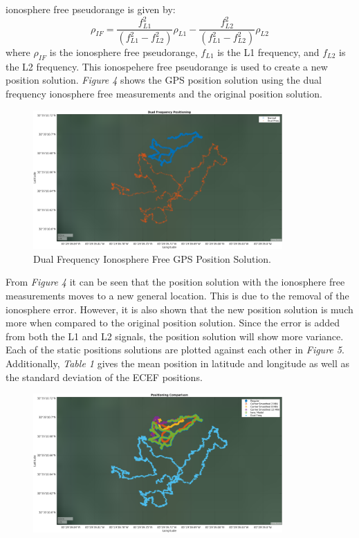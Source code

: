\documentclass[11pt]{article}
\begin{document}
\begin{enumerate}[label=\textbf{\arabic*.}]
    ionosphere free pseudorange is given by:
    \begin{equation}
      \rho_{IF} = \dfrac{f_{L1}^2}{(f_{L1}^2-f_{L2}^2)}\rho_{L1} - 
                  \dfrac{f_{L2}^2}{(f_{L1}^2-f_{L2}^2)}\rho_{L2}
    \end{equation}
    where $\rho_{IF}$ is the ionosphere free pseudorange, $f_{L1}$ is the L1 
    frequency, and $f_{L2}$ is the L2 frequency. This ionospehere free pseudorange 
    is used to create a new position solution. \emph{Figure 4} shows the GPS 
    position solution using the dual frequency ionosphere free measurements and 
    the original position solution. 
    \begin{figure}[H]
        \centering
        \includegraphics[width=0.85\textwidth]{p1_d.png}
        \caption{Dual Frequency Ionosphere Free GPS Position Solution.}
    \end{figure}
    From \emph{Figure 4} it can be seen that the position solution with the 
    ionosphere free measurements moves to a new general location. This is due to 
    the removal of the ionosphere error. However, it is also shown that the new 
    position solution is much more  when compared to the original position 
    solution. Since the error is added from both the L1 and L2 signals, the 
    position solution will show more variance. Each of the static positions 
    solutions are plotted against each other in \emph{Figure 5}. Additionally, 
    \emph{Table 1} gives the mean position in latitude and longitude as well as 
    the standard deviation of the ECEF positions.
    \begin{figure}[H]
        \centering
        \includegraphics[width=0.85\textwidth]{p1_f.png}

\end{figure}
\end{enumerate}
\end{document}
